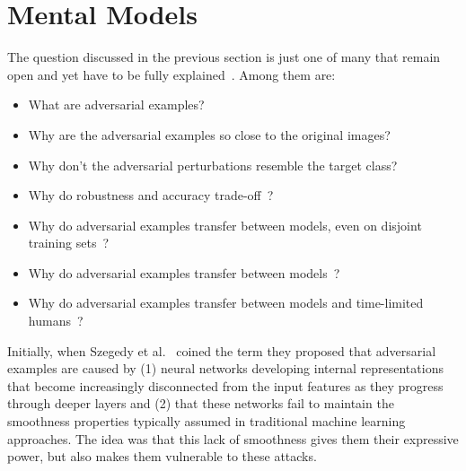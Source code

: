 \documentclass[a4paper, oneside]{discothesis}
\begin{document}
\section{Mental Models}

The question discussed in the previous section is just one of many that remain open and yet have to be fully explained~\cite{shamir2021dimpled}. Among them are:

\begin{itemize}
	\setlength\itemsep{0em}
	\item What are adversarial examples?
	\item Why are the adversarial examples so close to the original images?
	\item Why don't the adversarial perturbations resemble the target class?
	\item Why do robustness and accuracy trade-off~\cite{zhang2019theoretically}?
	\item Why do adversarial examples transfer between models, even on disjoint training sets~\cite{szegedy2013intriguing}?
	\item Why do adversarial examples transfer between models~\cite{szegedy2013intriguing}?
	\item Why do adversarial examples transfer between models and time-limited humans~\cite{elsayed2018adversarial}?
\end{itemize}

Initially, when Szegedy et al.\ \cite{szegedy2013intriguing} coined the term they proposed that adversarial examples are caused by (1) neural networks developing internal representations that become increasingly disconnected from the input features as they progress through deeper layers and (2) that these networks fail to maintain the smoothness properties typically assumed in traditional machine learning approaches. The idea was that this lack of smoothness gives them their expressive power, but also makes them vulnerable to these attacks.
\end{document}
